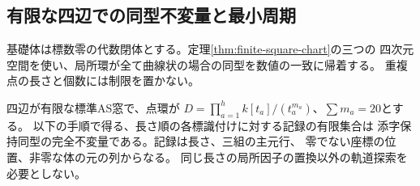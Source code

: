 \subsection{有限な四辺での同型不変量と最小周期}
\label{sec:curvilinear-window-orbits}
基礎体は標数零の代数閉体とする。定理\ref{thm:finite-square-chart}の三つの
四次元空間を使い、局所環が全て曲線状の場合の同型を数値の一致に帰着する。
重複点の長さと個数には制限を置かない。

\begin{theorem}\label{thm:curvilinear-window-orbits}
四辺が有限な標準AS窓で、点環が
$D=\prod_{a=1}^h k[t_a]/(t_a^{m_a})$、$\sum m_a=20$とする。
以下の手順で得る、長さ順の各標識付けに対する記録の有限集合は
添字保持同型の完全不変量である。記録は長さ、三組の主元行、
零でない座標の位置、非零な体の元の列からなる。
同じ長さの局所因子の置換以外の軌道探索を必要としない。
\end{theorem}
